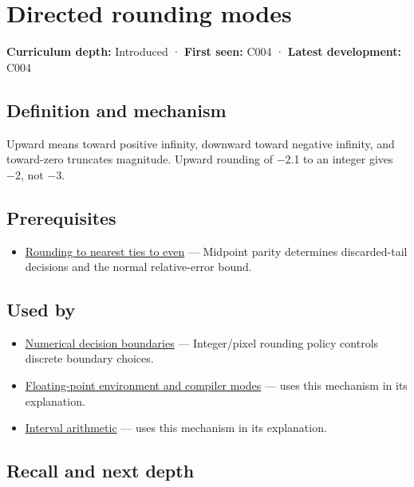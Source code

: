 \hypertarget{appendix-637d164ae5ca}{}
\section{Directed rounding modes}\label{appendix-637d164ae5ca-directed-rounding-modes}

\textbf{Curriculum depth:} Introduced · \textbf{First seen:} C004 · \textbf{Latest development:} C004

\subsection{Definition and mechanism}\label{appendix-637d164ae5ca-definition-and-mechanism}

Upward means toward positive infinity, downward toward negative infinity, and toward-zero truncates magnitude. Upward rounding of −2.1 to an integer gives −2, not −3.

\subsection{Prerequisites}\label{appendix-637d164ae5ca-prerequisites}

\begin{itemize}
\tightlist
\item
  \hyperref[appendix-614afe1de592]{Rounding to nearest ties to even} --- Midpoint parity determines discarded-tail decisions and the normal relative-error bound.
\end{itemize}

\subsection{Used by}\label{appendix-637d164ae5ca-used-by}

\begin{itemize}
\item
  \hyperref[appendix-c80db39080be]{Numerical decision boundaries} --- Integer/pixel rounding policy controls discrete boundary choices.
\item
  \hyperref[appendix-f11d1a521253]{Floating-point environment and compiler modes} --- uses this mechanism in its explanation.
\item
  \hyperref[appendix-1823a14330cb]{Interval arithmetic} --- uses this mechanism in its explanation.
\end{itemize}

\subsection{Recall and next depth}\label{appendix-637d164ae5ca-recall-and-next-depth}


